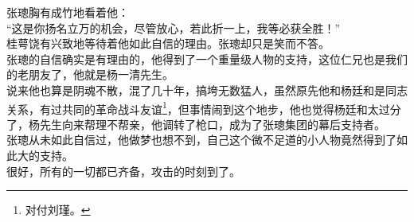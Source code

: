 \begin{multicols}{\theparacolNo}
张璁胸有成竹地看着他：\\

“这是你扬名立万的机会，尽管放心，若此折一上，我等必获全胜！”\\

桂萼饶有兴致地等待着他如此自信的理由。张璁却只是笑而不答。\\

张璁的自信确实是有理由的，他得到了一个重量级人物的支持，这位仁兄也是我们的老朋友了，他就是杨一清先生。\\

说来他也算是阴魂不散，混了几十年，搞垮无数猛人，虽然原先他和杨廷和是同志关系，有过共同的革命战斗友谊\footnote{对付刘瑾。}，但事情闹到这个地步，他也觉得杨廷和太过分了，杨先生向来帮理不帮亲，他调转了枪口，成为了张璁集团的幕后支持者。\\

张璁从未如此自信过，他做梦也想不到，自己这个微不足道的小人物竟然得到了如此大的支持。\\

很好，所有的一切都已齐备，攻击的时刻到了。\\
\ifnum{}
	\end{multicols}
\fi
\newpage
